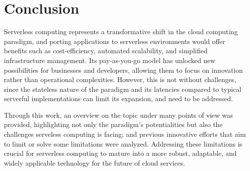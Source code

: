 \documentclass[
	a4paper, %
	12pt,
	twoside, %
]{LTJournalArticle}
\begin{document}
\section{Conclusion}
Serverless computing represents a transformative shift in the cloud computing paradigm, and porting applications to serverless environments would offer benefits such as cost-efficiency, automated scalability, and simplified infrastructure management. Its pay-as-you-go model has unlocked new possibilities for businesses and developers, allowing them to focus on innovation rather than operational complexities. However, this is not without challenges, since the stateless nature of the paradigm and its latencies compared to typical serverful implementations can limit its expansion, and need to be addressed. 

Through this work, an overview on the topic under many points of view was provided, highlighting not only the paradigm's potentialities but also the challenges serveless computing is facing; and previous innovative efforts that aim to limit or solve some limitations were analyzed. Addressing these limitations is crucial for serverless computing to mature into a more robust, adaptable, and widely applicable technology for the future of cloud services.



\printbibliography %

\end{document}
